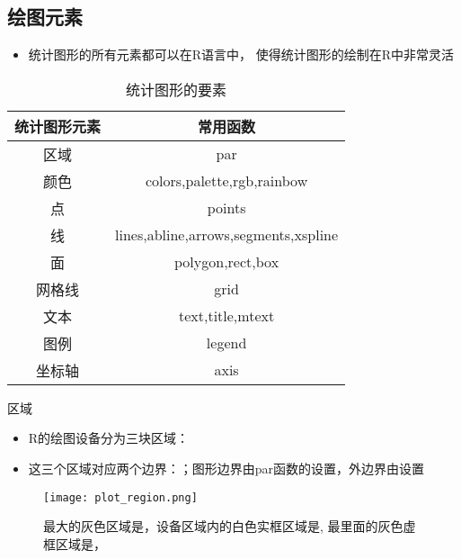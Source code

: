 \subsection{绘图元素}
\begin{frame}[t]{\subsecname}
\begin{itemize}
\item 统计图形的所有元素都可以在R语言中，
使得统计图形的绘制在R中非常灵活
\end{itemize}

\begin{overlayarea}{\textwidth}{\textheight}
  \begin{table} \centering \small
    \begin{tabular}{|c|c|}
      \toprule
      \rowcolor{LightCyan}
      \textbf{统计图形元素} & \textbf{常用函数}\\\hline
      区域 & par\\\hline
      颜色 & colors,palette,rgb,rainbow\\\hline
      点 & points\\\hline
      线 & lines,abline,arrows,segments,xspline\\\hline
      面 & polygon,rect,box \\\hline
      网格线 & grid \\\hline
      文本 & text,title,mtext \\\hline
      图例 & legend\\\hline
      坐标轴 & axis \\   
      \bottomrule
    \end{tabular}
    \caption{统计图形的要素}
  \end{table}
\end{overlayarea}  
\end{frame}

\begin{frame}[t]{\subsecname}{区域}
\begin{itemize}
\item R的绘图设备分为三块区域：
\item 这三个区域对应两个边界：；图形边界由par函数的设置，外边界由设置
\end{itemize}  

\begin{figure}
  \centering
  \texttt{[image: plot\_region.png]}
  \caption{最大的灰色区域是，设备区域内的白色实框区域是,
最里面的灰色虚框区域是，}
\end{figure}
\end{frame}

